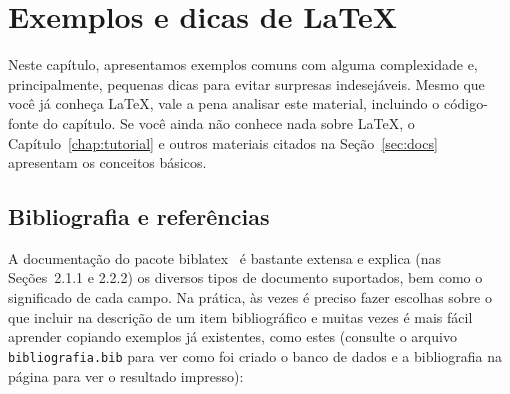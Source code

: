 
\chapter{Exemplos e dicas de \LaTeX{}}
\label{chap:exemplos}

Neste capítulo, apresentamos exemplos comuns com alguma complexidade e,
principalmente, pequenas dicas para evitar surpresas indesejáveis. Mesmo
que você já conheça \LaTeX{}, vale a pena analisar este material, incluindo
o código-fonte do capítulo. Se você ainda não conhece nada sobre \LaTeX{},
o Capítulo~\ref{chap:tutorial} e outros materiais citados na
Seção~\ref{sec:docs} apresentam os conceitos básicos.

\section{Bibliografia e referências}
\label{sec:exemplos-biblatex}

A documentação do pacote biblatex~\citep{biblatex} é
bastante extensa e explica (nas Seções~2.1.1 e 2.2.2) os diversos
tipos de documento suportados, bem como o significado de cada campo.
Na prática, às vezes é preciso fazer escolhas sobre
o que incluir na descrição de um item bibliográfico e muitas vezes
é mais fácil aprender copiando exemplos já existentes, como estes (consulte o
arquivo \texttt{bibliografia.bib} para ver como foi criado o banco de dados e a
bibliografia na página \pageref{bibliografia} para ver o resultado impresso):

